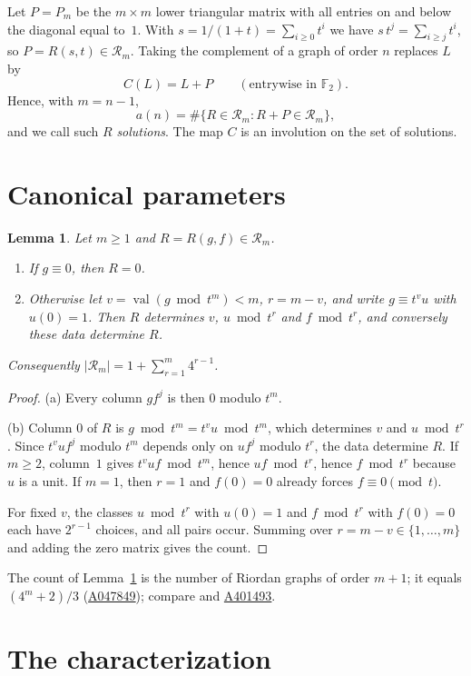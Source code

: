 \documentclass[11pt,a4paper]{amsart}
\newtheorem{lemma}[theorem]{Lemma}
\theoremstyle{definition}
\theoremstyle{remark}
\newcommand{\F}{\mathbb{F}_2}
\newcommand{\Rm}{\mathcal{R}_m}
\newcommand{\val}{\operatorname{val}}
\newcommand{\oeis}[1]{\href{https://oeis.org/#1}{#1}}
\begin{document}
Let $P=P_m$ be the $m\times m$ lower triangular matrix with all entries on and below the diagonal equal to~$1$. With $s=1/(1+t)=\sum_{i\ge0}t^i$ we have $s\,t^j=\sum_{i\ge j}t^i$, so $P=R(s,t)\in\Rm$. Taking the complement of a graph of order $n$ replaces $L$ by
\[
  C(L)=L+P \qquad(\text{entrywise in }\F).
\]
Hence, with $m=n-1$,
\[
  a(n)=\#\{R\in\Rm : R+P\in\Rm\},
\]
and we call such $R$ \emph{solutions}. The map $C$ is an involution on the set of solutions.

\section{Canonical parameters}\label{sec:canon}

\begin{lemma}\label{lem:canon}
Let $m\ge1$ and $R=R(g,f)\in\Rm$.
\begin{enumerate}[label=\textup{(\alph*)}]
\item If $g\equiv 0$, then $R=0$.
\item Otherwise let $v=\val(g\bmod t^m)<m$, $r=m-v$, and write $g\equiv t^v u$ with $u(0)=1$. Then $R$ determines $v$, $u \bmod t^{r}$ and $f\bmod t^{r}$, and conversely these data determine $R$.
\end{enumerate}
Consequently $|\Rm| = 1+\sum_{r=1}^{m}4^{r-1}$.
\end{lemma}

\begin{proof}
(a) Every column $gf^j$ is then $0$ modulo $t^m$.

(b) Column $0$ of $R$ is $g\bmod t^m=t^v u \bmod t^m$, which determines $v$ and $u\bmod t^r$. Since $t^v u f^j$ modulo $t^m$ depends only on $u f^j$ modulo $t^{r}$, the data determine $R$. If $m\ge 2$, column~$1$ gives $t^v uf \bmod t^m$, hence $uf\bmod t^r$, hence $f\bmod t^r$ because $u$ is a unit. If $m=1$, then $r=1$ and $f(0)=0$ already forces $f\equiv0\pmod t$.

For fixed $v$, the classes $u\bmod t^r$ with $u(0)=1$ and $f\bmod t^r$ with $f(0)=0$ each have $2^{r-1}$ choices, and all pairs occur. Summing over $r=m-v\in\{1,\dots,m\}$ and adding the zero matrix gives the count.
\end{proof}

The count of Lemma~\ref{lem:canon} is the number of Riordan graphs of order $m+1$; it equals $(4^m+2)/3$ (\oeis{A047849}); compare \cite[Proposition~2.8]{CJKM} and \oeis{A401493}.

\section{The characterization}\label{sec:char}
\end{document}
